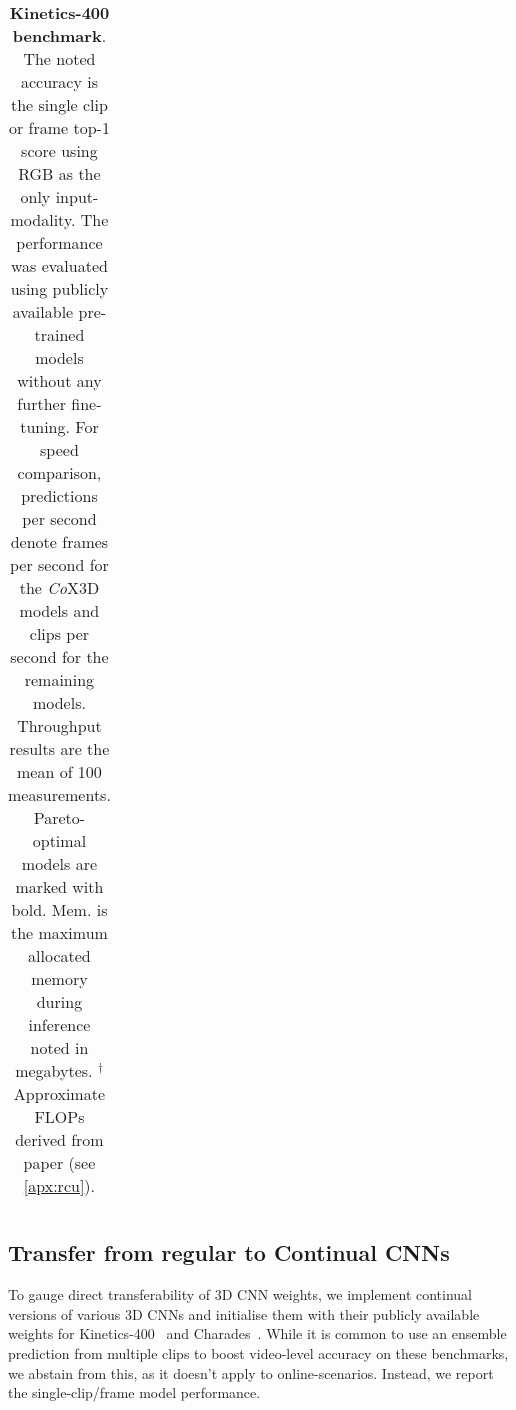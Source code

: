 \begin{table}[t]
\begin{center}
{\begin{tabular}{llrrrrrrrr}
    \bottomrule
\end{tabular}
}
\end{center}
\caption{
    \textbf{Kinetics-400 benchmark}. The noted accuracy is the single clip or frame top-1 score using RGB as the only input-modality. 
    The performance was evaluated using publicly available pre-trained models without any further fine-tuning. %
    For speed comparison, predictions per second denote frames per second for the \textit{Co}X3D models and clips per second for the remaining models. Throughput results are the mean of 100 measurements. 
    Pareto-optimal models are marked with bold.
    Mem. is the maximum allocated memory during inference noted in megabytes.
    $^\dagger$Approximate FLOPs derived from paper (see \cref{apx:rcu}).
}
\label{tab:benchmark-kinetics400}
\vspace{-9mm}
\end{table}


\vspace{-2mm}
\subsection{Transfer from regular to Continual CNNs} \label{exp:transfer-reg-to-co}
\vspace{-1mm}
To gauge direct transferability of 3D CNN weights, we implement continual versions of various 3D CNNs and initialise them with their publicly available weights for Kinetics-400~\cite{kay2017kinetics} and Charades~\cite{sigurdsson2016charades}. %
While it is common to use an ensemble prediction from multiple clips to boost video-level accuracy on these benchmarks, we abstain from this, as it doesn't apply to online-scenarios. Instead, we report the single-clip/frame model performance. 

